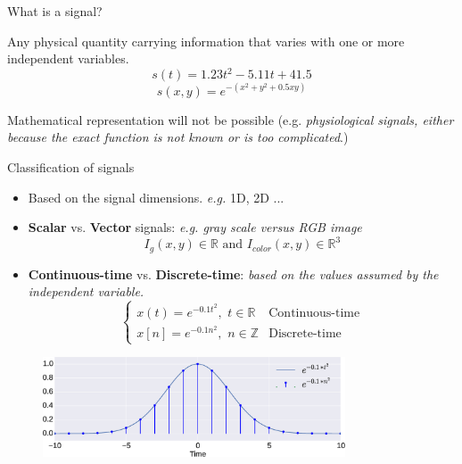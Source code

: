 \documentclass{beamer}
\begin{document}
\begin{frame}{What is a signal?}

Any physical quantity carrying information that varies with one or more independent variables.
$$ s\left(t\right) = 1.23t^2 - 5.11t +41.5 $$
$$ s\left(x,y\right) = e^{-(x^2 + y^2 + 0.5xy)} $$

Mathematical representation will not be possible (e.g. \textit{physiological signals,  either because the exact function is not known or is too complicated}.)
\end{frame}

\begin{frame}{Classification of signals}\
\begin{itemize}
\item Based on the signal dimensions. \textit{e.g.} 1D, 2D ...
\item \textbf{Scalar} vs. \textbf{Vector} signals: \textit{e.g. gray scale versus RGB image}
\[I_g\left(x,y\right) \in \mathbb{R} \,\,\mathrm{and}\,\, I_{color}\left(x,y\right) \in \mathbb{R}^3\]
\item \textbf{Continuous-time} vs. \textbf{Discrete-time}: \textit{based on the values assumed by the independent variable.}
\[
\begin{cases}
x(t) = e^{-0.1t^{2}}, \,\, t \in \mathbb{R} & \text{Continuous-time} \\
x[n] = e^{-0.1n^{2}}, \,\, n \in \mathbb{Z} & \text{Discrete-time}
\end{cases}
 \]
\end{itemize}
\begin{figure}
\includegraphics[width=0.8\textwidth]{img/cont_disc.eps}
\end{figure}
\end{frame}
\end{document}
